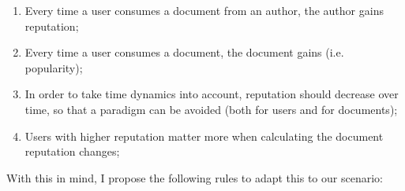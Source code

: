\begin{enumerate}
    \item Every time a user consumes a document from an author, the author gains reputation;
    \item Every time a user consumes a document, the document gains  (i.e. popularity);
    \item In order to take time dynamics into account, reputation should decrease over time, so that a  paradigm can be avoided (both for users and for documents);
    \item Users with higher reputation matter more when calculating the document reputation changes;
\end{enumerate}

With this in mind, I propose the following rules to adapt this to our scenario:

